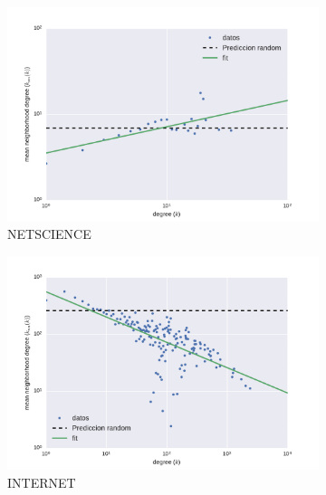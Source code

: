 \begin{figure}[!ht]
    \centering
    \begin{subfigure}[b]{0.45\columnwidth}
        \includegraphics[width=\textwidth]{./schemes/assort_netscience-gml_loglog.pdf}
        \caption{\label{fig4:NETSCIENCE}NETSCIENCE}
    \end{subfigure}
    \begin{subfigure}[b]{0.45\columnwidth}
        \includegraphics[width=\textwidth]{./schemes/assort_as-22july06-gml_loglog.pdf}
        \caption{\label{fig4:INTERNET}INTERNET}
    \end{subfigure}
    \\
    \begin{subfigure}[b]{0.45\columnwidth}

\end{subfigure}
\end{figure}
